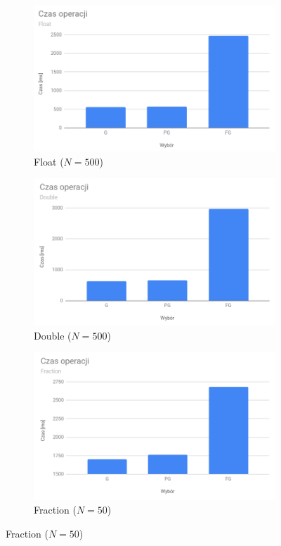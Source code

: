 \documentclass[11pt]{article}
\begin{document}
\begin{figure}[h!]
  \centering
  \begin{subfigure}[b]{0.45\linewidth}
    \includegraphics[width=\linewidth]{wykres_czas_float.png}
    \caption{Float ($N = 500$)}
  \end{subfigure}
  \begin{subfigure}[b]{0.45\linewidth}
    \includegraphics[width=\linewidth]{wykres_czas_double.png}
    \caption{Double ($N = 500$)}
  \end{subfigure}
\begin{subfigure}[b]{0.45\linewidth}
    \includegraphics[width=\linewidth]{wykres_czas_fraction.png}
    \caption{Fraction ($N = 50$)}
  \end{subfigure}
  \label{fig:wykres}
\end{figure}
\end{document}

